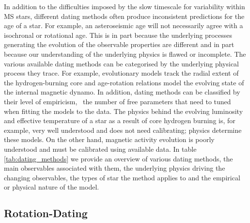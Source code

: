 In addition to the difficulties imposed by the slow timescale for variability
within MS stars, different dating methods often produce inconsistent
predictions for the age of a star.
For example, an asteroseismic age will not necessarily agree with a isochronal
or rotational age.
This is in part because the underlying processes generating the evolution of
the observable properties are different and in part because our understanding
of the underlying physics is flawed or incomplete.
The various available dating methods can be categorised by the underlying
physical process they trace.
For example, evolutionary models track the radial extent of the
hydrogen-burning core and age-rotation relations model the evolving state of
the internal magnetic dynamo.
In addition, dating methods can be classified by their level of empiricism,
\ie\ the number of free parameters that need to tuned when fitting the models
to the data.
The physics behind the evolving luminosity and effective temperature of a star
as a result of core hydrogen burning is, for example, very well understood and
does not need calibrating; physics determine these models.
On the other hand, magnetic activity evolution is poorly understood and must
be calibrated using available data.
In table \ref{tab:dating_methods} we provide an overview of various dating
methods, the main observables associated with them, the underlying physics
driving the changing observables, the types of star the method applies to and
the empirical or physical nature of the model.

\subsection{Rotation-Dating}
\label{sec:rotation}

